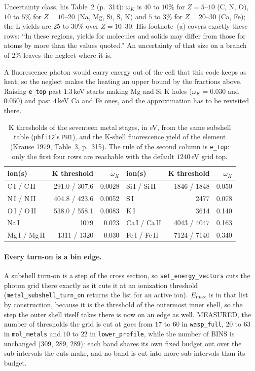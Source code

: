 \documentclass[english,a4paper]{my_memo}
\begin{document}
Uncertainty class, his Table~2 (p.~314): $\omega_K$ is $40$ to $10\%$ for
$Z = 5$--$10$ (C, N, O), $10$ to $5\%$ for $Z = 10$--$20$ (Na, Mg, Si, S, K)
and $5$ to $3\%$ for $Z = 20$--$30$ (Ca, Fe); the L yields are $25$ to
$30\%$ over $Z = 10$--$30$. His footnote~(a) covers exactly these rows:
``In these regions, yields for molecules and solids may differ from those
for atoms by more than the values quoted.'' An uncertainty of that size on a
branch of $2\%$ leaves the neglect where it is.

A fluorescence photon would carry energy out of the cell that this code
keeps as heat, so the neglect makes the heating an upper bound by the
fractions above. Raising \texttt{e\_top} past $1.3\,$keV starts making Mg
and Si K holes ($\omega_K = 0.030$ and $0.050$) and past $4\,$keV Ca and Fe
ones, and the approximation has to be revisited there.

\begin{table}[h]
\centering
\caption{K thresholds of the seventeen metal stages, in eV, from the same
subshell table (\texttt{phfit2}'s \texttt{PH1}), and the K-shell
fluorescence yield of the element (Krause 1979, Table~3, p.~315). The rule
of the second column is \texttt{e\_top}: only the first four rows are
reachable with the default $1240\,$eV grid top.}
\label{tab:kedge}
\begin{tabular}{lrr@{\qquad}lrr}
\toprule
ion(s) & K threshold & $\omega_K$ & ion(s) & K threshold & $\omega_K$\\
\midrule
C\,I / C\,II & 291.0 / 307.6 & 0.0028 & Si\,I / Si\,II & 1846 / 1848 & 0.050\\
N\,I / N\,II & 404.8 / 423.6 & 0.0052 & S\,I           & 2477        & 0.078\\
O\,I / O\,II & 538.0 / 558.1 & 0.0083 & K\,I           & 3614        & 0.140\\
Na\,I        & 1079          & 0.023  & Ca\,I / Ca\,II & 4043 / 4047 & 0.163\\
Mg\,I / Mg\,II & 1311 / 1320 & 0.030  & Fe\,I / Fe\,II & 7124 / 7140 & 0.340\\
\bottomrule
\end{tabular}
\end{table}

\paragraph{Every turn-on is a bin edge.} A subshell turn-on is a step of the
cross section, so \texttt{set\_energy\_vectors} cuts the photon grid there
exactly as it cuts it at an ionization threshold
(\texttt{metal\_subshell\_turn\_on} returns the list for an active ion).
$E_{\rm max}$ is in that list by construction, because it is the threshold
of the outermost inner shell, so the step the outer shell itself takes there
is now on an edge as well. MEASURED, the number of thresholds the grid is
cut at goes from $17$ to $60$ in \texttt{wasp\_full}, $20$ to $63$ in
\texttt{mol\_metals} and $10$ to $22$ in \texttt{lower\_profile}, while the
number of BINS is unchanged ($309$, $289$, $289$): each band shares its own
fixed budget out over the sub-intervals the cuts make, and no band is cut
into more sub-intervals than its budget.
\end{document}
